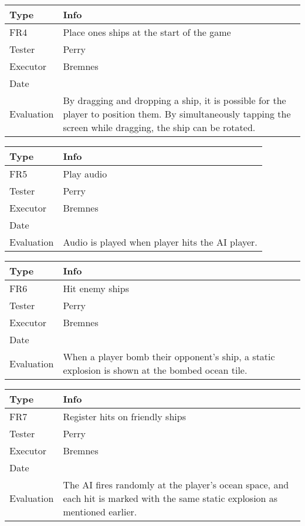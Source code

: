 \vspace{0.5em}

\noindent
\begin{tabular}{|p{2cm}|p{9.5cm}|}
	\hline
	\bf{Type}	& \bf{Info} \\
	\hline
	FR4			& Place ones ships at the start of the game \\
	Tester		& Perry \\
	Executor	& Bremnes \\
	Date		& \date{\today} \\
	Evaluation	& By dragging and dropping a ship, it is possible for the player to position them. By simultaneously tapping the screen while dragging, the ship can be rotated. \\
	\hline
\end{tabular}

\vspace{0.5em}

\noindent
\begin{tabular}{|p{2cm}|p{9.5cm}|}
	\hline
	\bf{Type}	& \bf{Info} \\
	\hline
	FR5			& Play audio \\
	Tester		& Perry \\
	Executor	& Bremnes \\
	Date		& \date{\today} \\
	Evaluation	& Audio is played when player hits the AI player. \\
	\hline
\end{tabular}

\vspace{0.5em}

\noindent
\begin{tabular}{|p{2cm}|p{9.5cm}|}
	\hline
	\bf{Type}	& \bf{Info} \\
	\hline
	FR6			& Hit enemy ships \\
	Tester		& Perry \\
	Executor	& Bremnes \\
	Date		& \date{\today} \\
	Evaluation	& When a player bomb their opponent's ship, a static explosion is shown at the bombed ocean tile. \\
	\hline
\end{tabular}

\vspace{0.5em}

\noindent
\begin{tabular}{|p{2cm}|p{9.5cm}|}
	\hline
	\bf{Type}	& \bf{Info} \\
	\hline
	FR7			& Register hits on friendly ships \\
	Tester		& Perry \\
	Executor	& Bremnes \\
	Date		& \date{\today} \\
	Evaluation	& The AI fires randomly at the player's ocean space, and each hit is marked with the same static explosion as mentioned earlier. \\
	\hline
\end{tabular}

